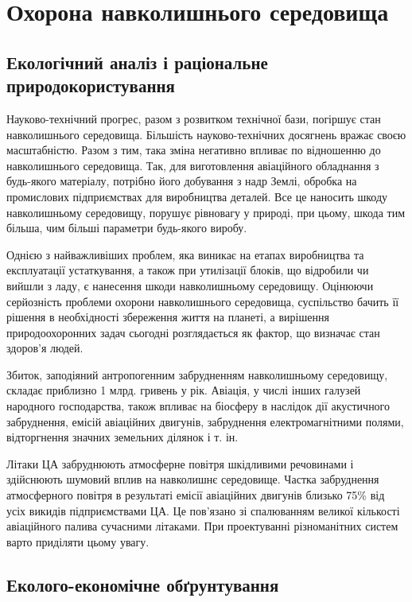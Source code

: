 \section{Охорона навколишнього середовища}

\subsection{Екологічний аналіз і раціональне природокористування}

Науково-технічний прогрес, разом з розвитком технічної бази, погіршує стан  навколишнього середовища. Більшість науково-технічних досягнень вражає своєю масштабністю. Разом з тим, така зміна негативно впливає по відношенню до навколишнього середовища. Так, для виготовлення авіаційного обладнання з будь-якого матеріалу, потрібно його добування з надр Землі, обробка  на промислових підприємствах для виробництва деталей. Все це наносить шкоду навколишньому середовищу, порушує рівновагу у природі, при цьому, шкода тим більша, чим більші параметри будь-якого виробу.

Однією з найважливіших проблем, яка виникає на етапах виробництва та експлуатації устаткування, а також при утилізації блоків, що відробили чи вийшли з ладу, є нанесення шкоди навколишньому середовищу.
Оцінюючи серйозність проблеми охорони навколишнього середовища, суспільство бачить її рішення в необхідності збереження життя на планеті, а вирішення природоохоронних задач сьогодні розглядається як фактор, що визначає стан здоров’я людей.

Збиток, заподіяний антропогенним забрудненням навколишньому середовищу, складає приблизно 1 млрд. гривень у рік.
Авіація, у числі інших галузей народного господарства, також впливає на біосферу в наслідок дії акустичного забруднення, емісій авіаційних двигунів, забруднення електромагнітними полями, відторгнення значних земельних ділянок і т. ін.

Літаки ЦА забруднюють атмосферне повітря шкідливими речовинами і здійснюють  шумовий  вплив  на  навколишнє  середовище.  Частка  забруднення атмосферного повітря в результаті емісії авіаційних двигунів близько 75\% 
від усіх викидів підприємствами ЦА. Це пов'язано зі спалюванням великої кількості авіаційного палива сучасними літаками.  При проектуванні різноманітних  систем варто приділяти цьому увагу. 

\subsection{Еколого-економічне обґрунтування}

